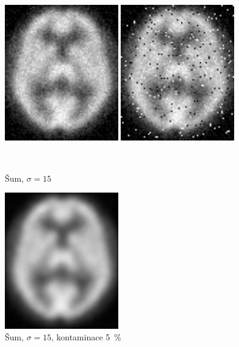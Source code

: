      \begin{figure}[h!]
        \begin{minipage}[l]{0.5\textwidth}
            \center
            \includegraphics[width = 140pt]{src/8Appendix/final/15-50noise.png}
        \end{minipage}
        \begin{minipage}[r]{0.5\textwidth}
            \center
            \includegraphics[width = 140pt]{src/8Appendix/final/15-50contaminated.png}
        \end{minipage}
        \\
        \begin{minipage}[l]{0.5\textwidth}
            \caption{Šum, $\sigma = 15$}
        \end{minipage}
        \begin{minipage}[r]{0.5\textwidth}
            \caption{Šum, $\sigma = 15$, kontaminace 5~\%}
        \end{minipage}
        \begin{minipage}[l]{0.5\textwidth}
            \center
            \includegraphics[width = 140pt]{src/8Appendix/final/15-50wbesL.png}

\end{minipage}
\end{figure}
